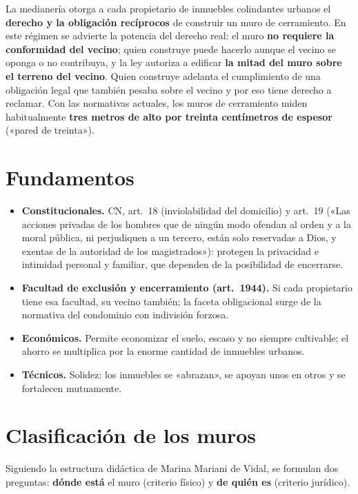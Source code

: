 \documentclass[12pt,oneside]{book}
\begin{document}
La medianería otorga a cada propietario de inmuebles colindantes urbanos el \textbf{derecho y la obligación recíprocos} de construir un muro de cerramiento. En este régimen se advierte la potencia del derecho real: el muro \textbf{no requiere la conformidad del vecino}; quien construye puede hacerlo aunque el vecino se oponga o no contribuya, y la ley autoriza a edificar \textbf{la mitad del muro sobre el terreno del vecino}. Quien construye adelanta el cumplimiento de una obligación legal que también pesaba sobre el vecino y por eso tiene derecho a reclamar. Con las normativas actuales, los muros de cerramiento miden habitualmente \textbf{tres metros de alto por treinta centímetros de espesor} («pared de treinta»).

\section{Fundamentos}

\begin{itemize}
    \item \textbf{Constitucionales.} CN, art.~18 (inviolabilidad del domicilio) y art.~19 («Las acciones privadas de los hombres que de ningún modo ofendan al orden y a la moral pública, ni perjudiquen a un tercero, están solo reservadas a Dios, y exentas de la autoridad de los magistrados»): protegen la privacidad e intimidad personal y familiar, que dependen de la posibilidad de encerrarse.
    \item \textbf{Facultad de exclusión y encerramiento (art.~1944).} Si cada propietario tiene esa facultad, su vecino también; la faceta obligacional surge de la normativa del condominio con indivisión forzosa.
    \item \textbf{Económicos.} Permite economizar el suelo, escaso y no siempre cultivable; el ahorro se multiplica por la enorme cantidad de inmuebles urbanos.
    \item \textbf{Técnicos.} Solidez: los inmuebles se «abrazan», se apoyan unos en otros y se fortalecen mutuamente.
\end{itemize}

\section{Clasificación de los muros}

Siguiendo la estructura didáctica de Marina Mariani de Vidal, se formulan dos preguntas: \textbf{dónde está} el muro (criterio físico) y \textbf{de quién es} (criterio jurídico).
\end{document}

